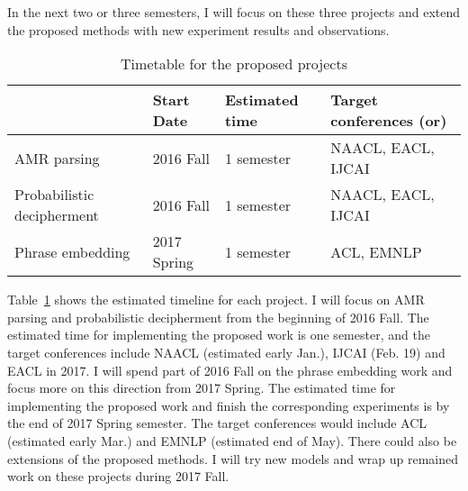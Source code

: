 In the next two or three semesters, I will focus on these three projects and extend
the proposed methods with new experiment results and observations. 
\begin{table}
\centering
\begin{center}
\begin{tabular}{|l|l|l|l|} \hline
            & Start Date  & Estimated time & Target conferences (or) \\ \hline
 AMR parsing  & 2016 Fall & 1 semester & NAACL, EACL, IJCAI\\ \hline
 Probabilistic decipherment & 2016 Fall & 1 semester & NAACL, EACL, IJCAI\\ \hline
 Phrase embedding & 2017 Spring & 1 semester & ACL, EMNLP\\ \hline
\end{tabular}
\caption{Timetable for the proposed projects}
\label{tab:schedule}
\end{center}
\end{table}
Table~\ref{tab:schedule} shows the estimated timeline for each project. I will focus on AMR parsing and probabilistic decipherment from the beginning of 
2016 Fall. The estimated time for implementing the proposed work is one semester, and the target conferences 
include NAACL (estimated early Jan.), IJCAI (Feb. 19) and EACL in 2017.
I will spend part of 2016 Fall on the phrase embedding work and focus more on this direction from 2017 Spring. The estimated time for implementing the proposed work and finish the corresponding experiments is 
by the end of 2017 Spring semester. The target conferences would include ACL (estimated early Mar.) and EMNLP (estimated end of May).
There could also be extensions of the proposed methods. I will try new models and wrap up remained work on these projects during 2017 Fall. 
